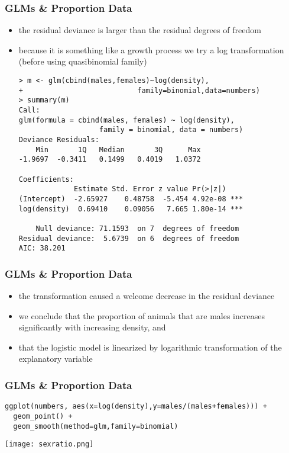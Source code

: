 \begin{frame}[fragile]\frametitle{GLMs \& Proportion Data}
  \begin{itemize}
  \item the residual deviance is larger than the residual degrees of freedom
  \item because it is something like a growth process we try a log transformation (before using quasibinomial family)\tiny
\begin{verbatim}
> m <- glm(cbind(males,females)~log(density),
+                           family=binomial,data=numbers)
> summary(m)
Call:
glm(formula = cbind(males, females) ~ log(density), 
                   family = binomial, data = numbers)
Deviance Residuals: 
    Min       1Q   Median       3Q      Max  
-1.9697  -0.3411   0.1499   0.4019   1.0372  

Coefficients:
             Estimate Std. Error z value Pr(>|z|)    
(Intercept)  -2.65927    0.48758  -5.454 4.92e-08 ***
log(density)  0.69410    0.09056   7.665 1.80e-14 ***

    Null deviance: 71.1593  on 7  degrees of freedom
Residual deviance:  5.6739  on 6  degrees of freedom
AIC: 38.201
\end{verbatim}
  \end{itemize}
\end{frame}

\begin{frame}[fragile]\frametitle{GLMs \& Proportion Data}
  \begin{itemize}
  \item the transformation caused a welcome decrease in the residual deviance
  \item we conclude that the proportion of animals that are males increases significantly with
increasing density, and 
\item that the logistic model is linearized by logarithmic transformation of the explanatory variable
  \end{itemize}
\end{frame}

\begin{frame}[fragile]\frametitle{GLMs \& Proportion Data}
\begin{verbatim}
ggplot(numbers, aes(x=log(density),y=males/(males+females))) +
  geom_point() +
  geom_smooth(method=glm,family=binomial)
\end{verbatim}
\begin{center}
\texttt{[image: sexratio.png]}
\end{center}
\end{frame}
